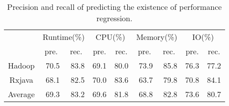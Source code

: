 \begin{table}[]
	\centering
	\footnotesize
	\caption{Precision and recall of predicting the existence of performance regression.}
	\label{tab:logistic}
	\begin{tabular}{|c|r|r|r|r|r|r|r|r|}
		\hline
		\multicolumn{1}{|l|}{\multirow{2}{*}{}} & \multicolumn{2}{c|}{Runtime(\%)}                      & \multicolumn{2}{c|}{CPU(\%)}                          & \multicolumn{2}{c|}{Memory(\%)}                       & \multicolumn{2}{c|}{IO(\%)}                           \\ \cline{2-9} 
		\multicolumn{1}{|l|}{}                  & \multicolumn{1}{c|}{pre.} & \multicolumn{1}{c|}{rec.} & \multicolumn{1}{c|}{pre.} & \multicolumn{1}{c|}{rec.} & \multicolumn{1}{c|}{pre.} & \multicolumn{1}{c|}{rec.} & \multicolumn{1}{c|}{pre.} & \multicolumn{1}{c|}{rec.} \\ \hline
		Hadoop                                  & 70.5                      & 83.8                      & 69.1                      & 80.0                      & 73.9                      & 85.8                      & 76.3                      & 77.2                      \\ \hline
		Rxjava                                  & 68.1                      & 82.5                      & 70.0                      & 83.6                      & 63.7                      & 79.8                      & 70.8                      & 84.1                      \\ \hline
		Average                                 & 69.3                      & 83.2                      & 69.6                      & 81.8                      & 68.8                      & 82.8                      & 73.6                      & 80.7                      \\ \hline
	\end{tabular}
\end{table}

